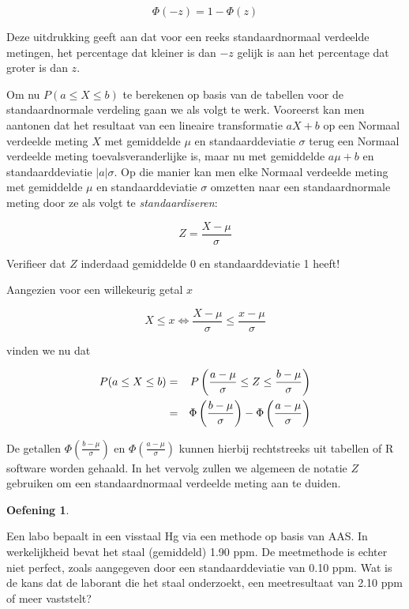 \documentclass[
  12pt,dutch,coursenotes]{book}
\theoremstyle{definition}
\theoremstyle{definition}
\theoremstyle{definition}
\newtheorem{exercise}{Oefening}[chapter]
\theoremstyle{remark}
\begin{document}
\begin{equation*}
\Phi(-z)= 1- \Phi(z)
\end{equation*}

Deze uitdrukking geeft aan dat voor een reeks standaardnormaal verdeelde
metingen, het percentage dat kleiner is dan \(-z\) gelijk is aan
het percentage dat groter is dan \(z\).

Om nu \(P(a\leq X\leq b)\) te berekenen op basis van de tabellen voor de
standaardnormale verdeling gaan we als volgt te werk. Vooreerst kan men
aantonen dat het resultaat van een lineaire transformatie \(aX+b\) op een
Normaal verdeelde meting \(X\) met gemiddelde \(\mu\) en standaarddeviatie \(\sigma\) terug een Normaal verdeelde meting toevalsveranderlijke is, maar nu
met gemiddelde \(a\mu+b\) en standaarddeviatie \(|a|\sigma\). Op die manier kan
men elke Normaal verdeelde meting met gemiddelde \(\mu\) en standaarddeviatie \(\sigma\) omzetten naar een standaardnormale meting door ze als volgt te
\emph{standaardiseren}:

\begin{equation*}
Z = \frac{X- \mu}{\sigma}
\end{equation*}

Verifieer dat \(Z\) inderdaad gemiddelde 0 en standaarddeviatie 1 heeft!

Aangezien voor een willekeurig getal \(x\)

\begin{equation*}
X\leq x \Leftrightarrow \frac{X-\mu}{\sigma} \leq \frac{x-\mu}{\sigma}
\end{equation*}

vinden we nu dat

\begin{eqnarray*}
P(a \leq X \leq b) & = & P\left(\frac{a-\mu}{\sigma} \leq Z \leq \frac{b-\mu%
}{\sigma} \right) \\
& = & \Phi \left (\frac{b-\mu}{\sigma} \right ) - \Phi \left (\frac{a-\mu}{%
\sigma} \right )
\end{eqnarray*}

De getallen \(\Phi \left (\frac{b-\mu}{\sigma} \right )\) en \(\Phi \left (\frac{a-\mu}{\sigma} \right )\) kunnen hierbij rechtstreeks uit tabellen of R software worden gehaald. In het vervolg zullen we
algemeen de notatie \(Z\) gebruiken om een standaardnormaal verdeelde meting
aan te duiden.

\begin{exercise}
\protect\hypertarget{exr:unnamed-chunk-42}{}{\label{exr:unnamed-chunk-42} }
\end{exercise}
Een labo bepaalt in een visstaal Hg via een methode op basis van AAS. In
werkelijkheid bevat het staal (gemiddeld) 1.90 ppm. De meetmethode is echter
niet perfect, zoals aangegeven door een standaarddeviatie van 0.10 ppm. Wat
is de kans dat de laborant die het staal onderzoekt, een meetresultaat van
2.10 ppm of meer vaststelt?
\end{document}
